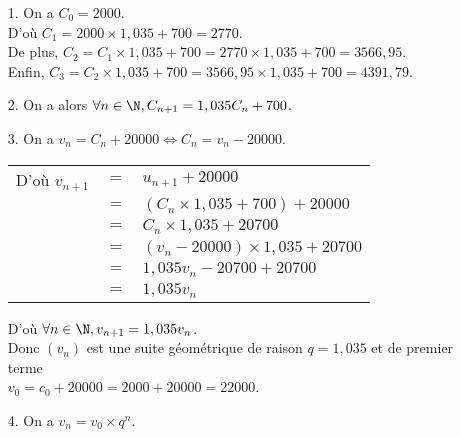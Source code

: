 \begin{itemize}
\item[1.] On a $C_0 = 2000$. \\
D'où $C_1 = 2000 \times 1,035 + 700 = 2770$. \\
De plus, $C_2 = C_1 \times 1,035 + 700 = 2770 \times 1,035 + 700 = 3566,95$. \\
Enfin, $C_3 = C_2 \times 1,035 + 700 = 3566,95 \times 1,035 + 700 = 4391,79$. \\

\item[2.] On a alors $\forall n \in \N, C_{n+1} = 1,035C_n + 700$. \\

\newpage

\item[3.] On a $v_n = C_n + 20000 \Longleftrightarrow C_n = v_n - 20000$. \\

\begin{tabular}{lll}
\hspace*{-.3cm} D'où $v_{n+1}$ & $=$ & $u_{n+1} + 20000$ \vspace*{.3cm} \\
& $=$ & $\left(C_n \times 1,035 + 700\right) + 20000$ \vspace*{.3cm} \\
& $=$ & $C_n \times 1,035 + 20700$ \vspace*{.3cm} \\
& $=$ & $\left(v_n - 20000\right)\times 1,035 + 20700$ \vspace*{.3cm} \\
& $=$ & $1,035v_n - 20700 + 20700$ \vspace*{.3cm} \\
& $=$ & $1,035v_n$ \\
\end{tabular}

\vspace*{.3cm}

D'où $\forall n \in \N, v_{n+1} = 1,035v_n$. \\

Donc $\left(v_n\right)$ est une suite géométrique de raison $q = 1,035$ et de premier terme \\ $v_0 = c_0 + 20000 = 2000 + 20000 = 22000$. \\

\item[4.] On a $v_n = v_0 \times q^n$. \\


\end{itemize}
